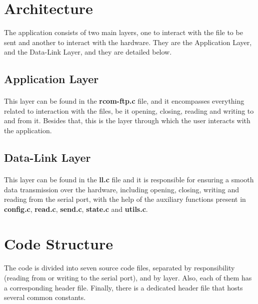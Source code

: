 \documentclass[11pt]{article}
\begin{document}
\section{Architecture}

The application consists of two main layers, one to interact with the file to be sent and another to
interact with the hardware. They are the Application Layer, and the Data-Link Layer, and they are detailed
below.

\subsection{Application Layer}

\paragraph{}This layer can be found in the \textbf{rcom-ftp.c} file, and it encompasses everything related
to interaction with the files, be it opening, closing, reading and writing to and from it. Besides that,
this is the layer through which the user interacts with the application.

\subsection{Data-Link Layer}

\paragraph{}This layer can be found in the \textbf{ll.c} file and it is responsible for ensuring a smooth
data transmission over the hardware, including opening, closing, writing and reading from the serial port,
with the help of the auxiliary functions present in \textbf{config.c}, \textbf{read.c}, \textbf{send.c},
\textbf{state.c} and \textbf{utils.c}.

\section{Code Structure}

\paragraph{}The code is divided into seven source code files, separated by responsibility (reading from or
writing to the serial port), and by layer. Also, each of them has a corresponding header file. Finally,
there is a dedicated header file that hosts several common constants.
\end{document}

